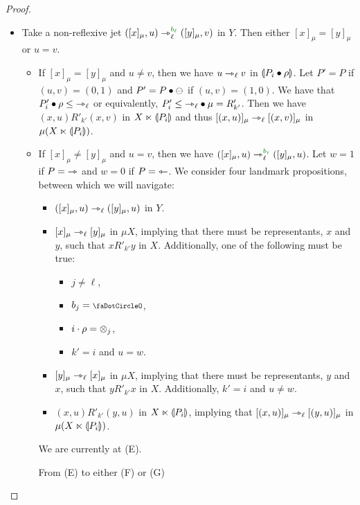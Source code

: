 \documentclass[a4paper]{memoir}
\begin{document}
\begin{proof}
\begin{enumerate}
\begin{itemize}
			\item[\framebox{$\leftarrow$}]
			Take a non-reflexive jet $([x]_\mu, u) \jet_\ell\pmr{b_\ell} ([y]_\mu, v)$ in $Y$.
			Then either $[x]_\mu = [y]_\mu$ or $u = v$.
			\begin{itemize}
				\item If $[x]_\mu = [y]_\mu$ and $u \neq v$, then we have $u \rightarrowtriangle_\ell v$ in ${\llparenthesis P_i \mathbin{\bullet} \rho \rrparenthesis}$.
				Let $P' = P$ if $(u, v) = (0, 1)$ and $P' = P \mathbin{\bullet} {\ominus}$ if $(u, v) = (1, 0)$.
				We have that $P'_i \mathbin{\bullet} \rho \leq {\rightarrowtriangle}_\ell$ or equivalently, $P'_i \leq {\rightarrowtriangle}_\ell \mathbin{\bullet} \mu = R'_{k'}$.
				Then we have $(x, u) \mathrel{R'_{k'}} (x, v)$ in $X \ltimes {\llparenthesis P_i \rrparenthesis}$ and thus $[(x, u)]_\mu \rightarrowtriangle_\ell [(x, v)]_\mu$ in $\mu(X \ltimes {\llparenthesis P_i \rrparenthesis})$.
				\item If $[x]_\mu \neq [y]_\mu$ and $u = v$, then we have $([x]_\mu, u) \jet_\ell\pmr{b_\ell} ([y]_\mu, u)$.
				Let $w = 1$ if $P = {\rightarrowtriangle}$ and $w = 0$ if $P = {\leftarrowtriangle}$.
				We consider four landmark propositions, between which we will navigate:
				\begin{itemize}
					\item[\textbf{(E)}] $([x]_\mu, u) \rightarrowtriangle_\ell ([y]_\mu, u)$ in $Y$.
					\item[\textbf{(F)}] $[x]_\mu \rightarrowtriangle_\ell [y]_\mu$ in $\mu X$, implying that there must be representants, \WLOG{} $x$ and $y$, such that $x \mathrel{R'_{k'}} y$ in $X$. Additionally, one of the following must be true:
					\begin{itemize}
						\item $j \neq \ell$,
						\item $b_j = \npolar$,
						\item $i \cdot \rho = {\otimes}_j$,
						\item $k' = i$ and $u = w$.
					\end{itemize}
					\item[\textbf{(G)}] $[y]_\mu \rightarrowtriangle_\ell [x]_\mu$ in $\mu X$, implying that there must be representants, \WLOG{} $y$ and $x$, such that $y \mathrel{R'_{k'}} x$ in $X$. Additionally,
					$k' = i$ and $u \neq w$.
					\item[\textbf{(H)}] $(x, u) \mathrel{R'_{k'}} (y, u)$ in $X \ltimes {\llparenthesis P_i \rrparenthesis}$, implying that $[(x, u)]_\mu \rightarrowtriangle_\ell [(y, u)]_\mu$ in $\mu(X \ltimes {\llparenthesis P_i \rrparenthesis})$.
				\end{itemize}
				We are currently at (E).
				\begin{description}
					\item[From (E) to either (F) or (G)]

\end{description}
\end{itemize}
\end{itemize}
\end{enumerate}
\end{proof}
\end{document}

